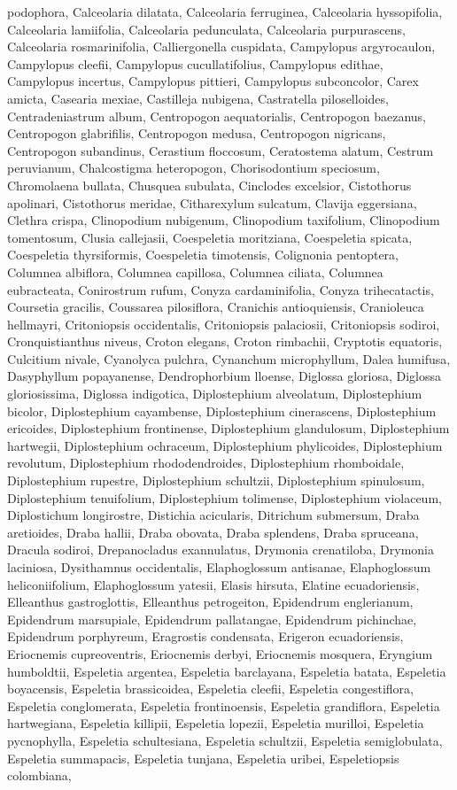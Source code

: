 \documentclass[]{article}
\begin{document}
podophora, Calceolaria dilatata, Calceolaria ferruginea, Calceolaria hyssopifolia, Calceolaria lamiifolia, Calceolaria pedunculata, Calceolaria purpurascens, Calceolaria rosmarinifolia, Calliergonella cuspidata, Campylopus argyrocaulon, Campylopus cleefii, Campylopus cucullatifolius, Campylopus edithae, Campylopus incertus, Campylopus pittieri, Campylopus subconcolor, Carex amicta, Casearia mexiae, Castilleja nubigena, Castratella piloselloides, Centradeniastrum album, Centropogon aequatorialis, Centropogon baezanus, Centropogon glabrifilis, Centropogon medusa, Centropogon nigricans, Centropogon subandinus, Cerastium floccosum, Ceratostema alatum, Cestrum peruvianum, Chalcostigma heteropogon, Chorisodontium speciosum, Chromolaena bullata, Chusquea subulata, Cinclodes excelsior, Cistothorus apolinari, Cistothorus meridae, Citharexylum sulcatum, Clavija eggersiana, Clethra crispa, Clinopodium nubigenum, Clinopodium taxifolium, Clinopodium tomentosum, Clusia callejasii, Coespeletia moritziana, Coespeletia spicata, Coespeletia thyrsiformis, Coespeletia timotensis, Colignonia pentoptera, Columnea albiflora, Columnea capillosa, Columnea ciliata, Columnea eubracteata, Conirostrum rufum, Conyza cardaminifolia, Conyza trihecatactis, Coursetia gracilis, Coussarea pilosiflora, Cranichis antioquiensis, Cranioleuca hellmayri, Critoniopsis occidentalis, Critoniopsis palaciosii, Critoniopsis sodiroi, Cronquistianthus niveus, Croton elegans, Croton rimbachii, Cryptotis equatoris, Culcitium nivale, Cyanolyca pulchra, Cynanchum microphyllum, Dalea humifusa, Dasyphyllum popayanense, Dendrophorbium lloense, Diglossa gloriosa, Diglossa gloriosissima, Diglossa indigotica, Diplostephium alveolatum, Diplostephium bicolor, Diplostephium cayambense, Diplostephium cinerascens, Diplostephium ericoides, Diplostephium frontinense, Diplostephium glandulosum, Diplostephium hartwegii, Diplostephium ochraceum, Diplostephium phylicoides, Diplostephium revolutum, Diplostephium rhododendroides, Diplostephium rhomboidale, Diplostephium rupestre, Diplostephium schultzii, Diplostephium spinulosum, Diplostephium tenuifolium, Diplostephium tolimense, Diplostephium violaceum, Diplostichum longirostre, Distichia acicularis, Ditrichum submersum, Draba aretioides, Draba hallii, Draba obovata, Draba splendens, Draba spruceana, Dracula sodiroi, Drepanocladus exannulatus, Drymonia crenatiloba, Drymonia laciniosa, Dysithamnus occidentalis, Elaphoglossum antisanae, Elaphoglossum heliconiifolium, Elaphoglossum yatesii, Elasis hirsuta, Elatine ecuadoriensis, Elleanthus gastroglottis, Elleanthus petrogeiton, Epidendrum englerianum, Epidendrum marsupiale, Epidendrum pallatangae, Epidendrum pichinchae, Epidendrum porphyreum, Eragrostis condensata, Erigeron ecuadoriensis, Eriocnemis cupreoventris, Eriocnemis derbyi, Eriocnemis mosquera, Eryngium humboldtii, Espeletia argentea, Espeletia barclayana, Espeletia batata, Espeletia boyacensis, Espeletia brassicoidea, Espeletia cleefii, Espeletia congestiflora, Espeletia conglomerata, Espeletia frontinoensis, Espeletia grandiflora, Espeletia hartwegiana, Espeletia killipii, Espeletia lopezii, Espeletia murilloi, Espeletia pycnophylla, Espeletia schultesiana, Espeletia schultzii, Espeletia semiglobulata, Espeletia summapacis, Espeletia tunjana, Espeletia uribei, Espeletiopsis colombiana, 
\end{document}
